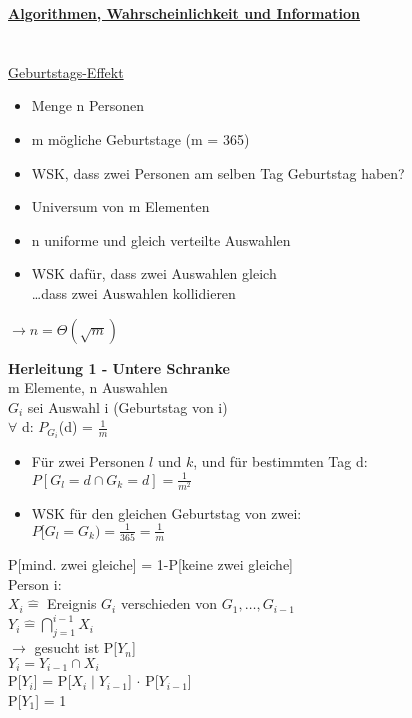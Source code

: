 \documentclass{article}
\begin{document}
 	\textbf{\underline{\large{Algorithmen, Wahrscheinlichkeit und Information}}}
 	\\ \\ \\
 	\underline{Geburtstags-Effekt}
 	\begin{itemize}
 		\item Menge n Personen
 		\item m mögliche Geburtstage (m = 365)
 		\item WSK, dass zwei Personen am selben Tag Geburtstag haben?
 	\end{itemize}
 	\begin{itemize}
 		\item Universum von m Elementen
 		\item n uniforme und gleich verteilte Auswahlen
 		\item WSK dafür, dass zwei Auswahlen gleich \\
 		\ldots dass zwei Auswahlen kollidieren
 	\end{itemize}
 	\begin{center}
 		$\rightarrow n = \Theta(\sqrt{m})$
 	\end{center}
 	\textbf{Herleitung 1 - Untere Schranke} \\
 	m Elemente, n Auswahlen \\
 	$G_i$ sei Auswahl i (Geburtstag von i) \\
 	$\forall$ d: $P_{G_i}$(d) = $\frac{1}{m}$
 	\begin{itemize}
 		\item Für zwei Personen $l$ und $k$, und für bestimmten Tag d: \\
 		$P[G_l = d \cap G_k = d] = \frac{1}{m^2}$
 		\item WSK für den gleichen Geburtstag von zwei: \\
 		$P[G_l=G_k) = \frac{1}{365} = \frac{1}{m}$
 	\end{itemize}
 	P[mind. zwei gleiche] = 1-P[keine zwei gleiche] \\
 	Person i: \\
 	$X_i \hat{=}$ Ereignis $G_i$ verschieden von $G_1, \ldots, G_{i-1}$ \\
 	$Y_i \hat{=} \bigcap_{j=1}^{i-1} X_i$ \\
 	$\rightarrow$ gesucht ist P[$Y_n$] \\
 	$Y_i = Y_{i-1} \cap X_i$ \\
 	P[$Y_i$] = P[$X_i \mid Y_{i-1}$] $\cdot$ P[$Y_{i-1}$] \\
 	P[$Y_1$] = 1 \\
\end{document}
